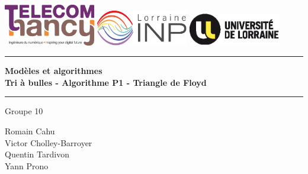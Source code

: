 \thispagestyle{empty}

{\color{primary}


\includegraphics[width=4.0cm]{img/school-logo.eps}
\hspace{9mm}
\includegraphics[width=4.0cm]{img/collegium-logo.eps}
\hspace{5mm}
\includegraphics[width=4.0cm]{img/university-logo.eps}

\vspace{0.5cm}

	\begin{center}


			{\color[rgb]{0.8,0.8,.8}\rule{\textwidth}{0.8pt}}
			\vspace{0.2cm}

			\baselineskip=3pt
			{\huge \bfseries{Modèles et algorithmes}}\\
			\vspace{0.5cm}
			{\Large \bfseries{Tri à bulles - Algorithme P1 - Triangle de Floyd}}
			\vspace{0.5cm}

		{\color[rgb]{0.8,0.8,.8}\rule{\textwidth}{0.8pt}}

		\vspace{1cm}

		\Large{Groupe 10}\\

		\vspace{1cm}
		\begin{minipage}{6in}
  		\centering
  		\hspace*{.2in}
		\end{minipage}

		\vspace{2cm}

		\Large{Romain Cahu}\\
		\Large{Victor Cholley-Barroyer}\\
		\Large{Quentin Tardivon}\\
		\Large{Yann Prono}\\
		\vspace{1cm}
		\large{\schoolYear}
	\end{center}

}
